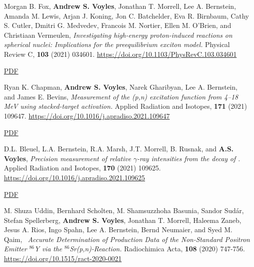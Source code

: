 \begin{bibsection}
\item Morgan B. Fox, \textbf{Andrew S. Voyles}, Jonathan T. Morrell, Lee A. Bernstein, Amanda M. Lewis, Arjan J. Koning, Jon C. Batchelder, Eva R. Birnbaum, Cathy S. Cutler, Dmitri G. Medvedev, Francois M. Nortier, Ellen M. O’Brien, and Christiaan Vermeulen, \emph{Investigating high-energy proton-induced reactions on spherical nuclei: Implications for the preequilibrium exciton model.} Physical Review C, \textbf{103} (2021) 034601. \url{https://doi.org/10.1103/PhysRevC.103.034601} 

\ifshort \vspace{0.1cm} \href{https://avoyles.github.io/papers/Fox2021_Nb.pdf}{\underline{PDF}} \else  \fi 


\item Ryan K. Chapman, \textbf{Andrew S. Voyles}, Narek Gharibyan, Lee A. Bernstein, and
James E. Bevins, \emph{Measurement of the (p,n) excitation function from 4--18 MeV using stacked-target activation.} Applied Radiation and Isotopes, \textbf{171} (2021) 109647.  \url{https://doi.org/10.1016/j.apradiso.2021.109647} 

\ifshort \vspace{0.1cm} \href{https://avoyles.github.io/papers/Chapman2021_160Tb.pdf}{\underline{PDF}} \else  \fi 


\item D.L. Bleuel, L.A. Bernstein, R.A. Marsh, J.T. Morrell, B. Rusnak, and \textbf{A.S. Voyles},  \emph{Precision measurement of relative $\gamma$-ray intensities from the decay of .} Applied Radiation and Isotopes, \textbf{170} (2021) 109625. \url{https://doi.org/10.1016/j.apradiso.2021.109625} 

\ifshort \vspace{0.1cm} \href{https://avoyles.github.io/papers/Bleuel2021_61Cu.pdf}{\underline{PDF}} \else  \fi 


\item M. Shuza Uddin, Bernhard Scholten, M. Shamsuzzhoha Basunia, Sandor Sudár, Stefan Spellerberg, \textbf{Andrew S. Voyles}, Jonathan T. Morrell, Haleema Zaneb, Jesus A. Rios, Ingo Spahn, Lee A. Bernstein, Bernd Neumaier, and Syed M. Qaim, \ \emph{Accurate Determination of Production Data of the Non-Standard Positron Emitter $^{86}$Y via the $^{86}$Sr(p,n)-Reaction.} Radiochimica Acta, \textbf{108} (2020) 747-756. \url{https://doi.org/10.1515/ract-2020-0021} 


\end{bibsection}
